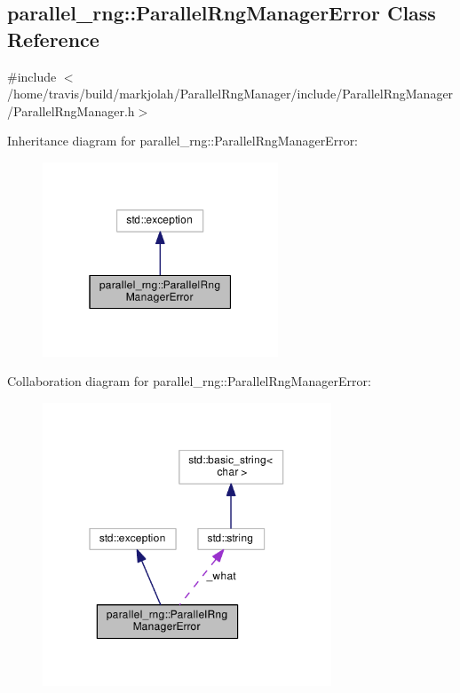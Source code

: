 \hypertarget{classparallel__rng_1_1ParallelRngManagerError}{}\subsection{parallel\+\_\+rng\+:\+:Parallel\+Rng\+Manager\+Error Class Reference}
\label{classparallel__rng_1_1ParallelRngManagerError}


{\ttfamily \#include $<$/home/travis/build/markjolah/\+Parallel\+Rng\+Manager/include/\+Parallel\+Rng\+Manager/\+Parallel\+Rng\+Manager.\+h$>$}



Inheritance diagram for parallel\+\_\+rng\+:\+:Parallel\+Rng\+Manager\+Error\+:\nopagebreak
\begin{figure}[H]
\begin{center}
\leavevmode
\includegraphics[width=199pt]{classparallel__rng_1_1ParallelRngManagerError__inherit__graph}
\end{center}
\end{figure}


Collaboration diagram for parallel\+\_\+rng\+:\+:Parallel\+Rng\+Manager\+Error\+:\nopagebreak
\begin{figure}[H]
\begin{center}
\leavevmode
\includegraphics[width=244pt]{classparallel__rng_1_1ParallelRngManagerError__coll__graph}
\end{center}
\end{figure}
